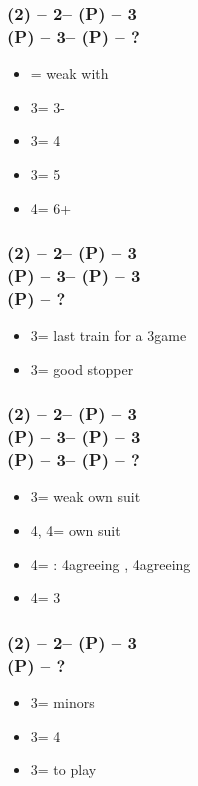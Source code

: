 \subsubsection*{(2\hearts) -- 2\nt -- (P) -- 3\clubs \\
                (P) -- 3\diams -- (P) -- ?}
\begin{itemize}
    \item \pass = weak with \diams
    \item 3\hearts = 3-\spades
    \item 3\spades = 4\spades
    \item 3\nt = 5\spades
    \item 4\clubs = 6+\spades
\end{itemize}

\subsubsection*{(2\hearts) -- 2\nt -- (P) -- 3\clubs \\
                (P) -- 3\diams -- (P) -- 3\hearts \\
                (P) -- ?}
\begin{itemize}
    \item 3\spades = last train for a 3\nt game
    \item 3\nt = good \hearts stopper
\end{itemize}

\subsubsection*{(2\hearts) -- 2\nt -- (P) -- 3\clubs \\
                (P) -- 3\diams -- (P) -- 3\hearts \\
                (P) -- 3\spades -- (P) -- ?}
\begin{itemize}
    \item 3\nt = weak own suit
    \item 4\clubs, 4\diams = own suit
    \item 4\hearts = \minor: 4\spades agreeing \clubs, 4\nt agreeing \diams
    \item 4\spades = 3\spades
\end{itemize}

\subsubsection*{(2\hearts) -- 2\nt -- (P) -- 3\diams \\
                (P) -- ?}
\begin{itemize}
    \item 3\hearts = minors
    \item 3\spades = 4\spades
    \item 3\nt = to play
\end{itemize}

